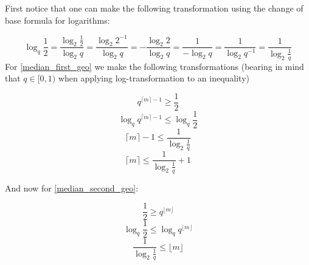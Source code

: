 \documentclass{article}
\begin{document}
First notice that one can make the following transformation using the change of base formula for logarithms:

\begin{equation*}
    \log_{q}\frac{1}{2} = \frac{\log_{2}\frac{1}{2}}{\log_{2}q} = \frac{\log_{2}2^{-1}}{\log_{2}q} = - \frac{\log_{2}2}{\log_{2}q} = \frac{1}{- \log_{2}q} = \frac{1}{\log_{2}q^{-1}} = \frac{1}{\log_{2}\frac{1}{q}}
\end{equation*}
For \eqref{median_first_geo} we make the following transformations
(bearing in mind that \(q \in [0, 1)\) when applying log-transformation to an inequality)

\begin{equation*}
    q^{\lceil m \rceil - 1} \geq \frac{1}{2}
\end{equation*}
\begin{equation*}
    \log_{q}q^{\lceil m \rceil - 1} \leq \log_{q}\frac{1}{2} 
\end{equation*}
\begin{equation*}
    \lceil m \rceil - 1 \leq \frac{1}{\log_{2}\frac{1}{q}}
\end{equation*}
\begin{equation*}
    \lceil m \rceil \leq \frac{1}{\log_{2}\frac{1}{q}} + 1
\end{equation*}

And now for \eqref{median_second_geo}:

\begin{equation*}
    \frac{1}{2} \geq q^{\lfloor m \rfloor}
\end{equation*}
\begin{equation*}
    \log_{q}\frac{1}{2} \leq \log_{q}q^{\lfloor m \rfloor}
\end{equation*}
\begin{equation*}
    \frac{1}{\log_{2}\frac{1}{q}} \leq \lfloor m \rfloor
\end{equation*}
\end{document}
